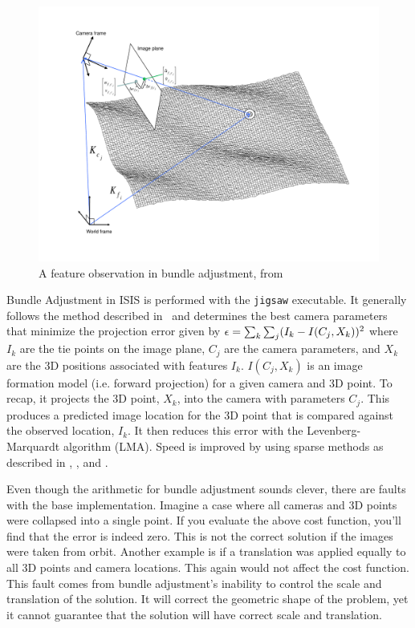 \begin{figure}[b!]
  \begin{center}
  \includegraphics[trim=20mm 20mm 20mm 15mm,clip,width=6in]{images/ba_feature_observation.pdf}
  \end{center}
  \caption{ A feature observation in bundle adjustment, from \citet{moore09} }
  \label{fig:ba_feature}
\end{figure}

Bundle Adjustment in \ac{ISIS} is performed with the \texttt{jigsaw}
executable. It generally follows the method described
in~\cite{triggs00} and determines the best camera parameters that
minimize the projection error given by ${\bf \epsilon} =
\sum_k\sum_j(I_k-I(C_j, X_k))^2$ where $I_k$ are the tie points on the
image plane, $C_j$ are the camera parameters, and $X_k$ are the 3D
positions associated with features $I_k$. $I(C_j, X_k)$ is an image
formation model (i.e. forward projection) for a given camera and 3D
point. To recap, it projects the 3D point, $X_k$, into the camera with
parameters $C_j$. This produces a predicted image location for the 3D
point that is compared against the observed location, $I_k$. It then
reduces this error with the Levenberg-Marquardt algorithm (LMA). Speed
is improved by using sparse methods as described in \citet{hartley04},
\citet{konolige:sparsesparse}, and \citet{cholmod}.

Even though the arithmetic for bundle adjustment sounds clever, there
are faults with the base implementation. Imagine a case where all
cameras and 3D points were collapsed into a single point. If you
evaluate the above cost function, you'll find that the error is indeed
zero. This is not the correct solution if the images were taken
from orbit. Another example is if a translation was applied equally to
all 3D points and camera locations. This again would not affect the
cost function. This fault comes from bundle adjustment's inability to
control the scale and translation of the solution. It will correct the
geometric shape of the problem, yet it cannot guarantee that the solution
will have correct scale and translation.

